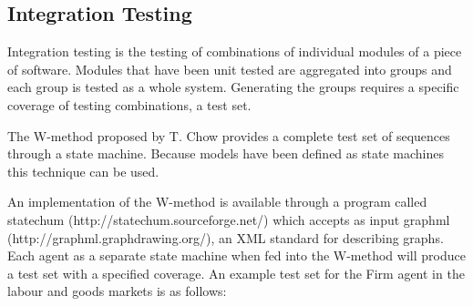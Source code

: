 \subsection{Integration Testing}


Integration testing is the testing of combinations of individual modules of a
piece of software. Modules that have been unit tested are aggregated into
groups and each group is tested as a whole system. Generating the groups
requires a specific coverage of testing combinations, a test set.

The W-method proposed by T. Chow \cite{CHOW:1978} provides a complete test set
of sequences through a state machine. Because models have been defined as state
machines this technique can be used.

An implementation of the W-method is available through a program called
statechum \cite{WALKINSHAW:2007,WALKINSHAW:2008}
(http://statechum.sourceforge.net/) which accepts as input graphml\\
(http://graphml.graphdrawing.org/), an XML standard for describing graphs.
Each agent as a separate state machine when fed into the W-method will
produce a test set with a specified coverage. An example test set for the Firm
agent in the labour and goods markets is as follows:

